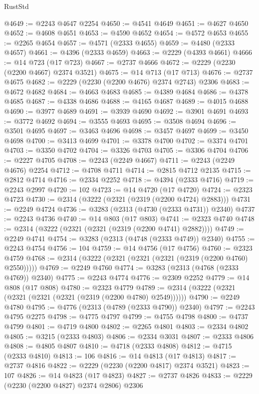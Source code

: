 \begin{lexlean}{RustStd}
\begin{coremodule}
@4649 := @2243 @4647 @2254
@4650 := @4541 @4649
@4651 := @4627 @4650
@4652 := @4608 @4651
@4653 := @4590 @4652
@4654 := @4572 @4653
@4655 := @2265 @4654
@4657 := @4571 (@2333 @4655)
@4659 := @4480 (@2333 @4657)
@4661 := @4396 (@2333 @4659)
@4663 := @2229 (@4393 @4661)
@4666 := @14 @723 (@17 @723)
@4667 := @2737 @4666
@4672 := @2229 (@2230 (@2200 @4667) @2374 @3521)
@4675 := @14 @713 (@17 @713)
@4676 := @2737 @4675
@4682 := @2229 (@2230 (@2200 @4676) @2374 @2743) @2306
@4683 := @4672 @4682
@4684 := @4663 @4683
@4685 := @4389 @4684
@4686 := @4378 @4685
@4687 := @4338 @4686
@4688 := @4165 @4687
@4689 := @4015 @4688
@4690 := @3977 @4689
@4691 := @3939 @4690
@4692 := @3901 @4691
@4693 := @3772 @4692
@4694 := @3555 @4693
@4695 := @3508 @4694
@4696 := @3501 @4695
@4697 := @3463 @4696
@4698 := @3457 @4697
@4699 := @3450 @4698
@4700 := @3413 @4699
@4701 := @3378 @4700
@4702 := @3374 @4701
@4703 := @3350 @4702
@4704 := @3326 @4703
@4705 := @3306 @4704
@4706 := @2227 @4705
@4708 := @2243 (@2249 @4667)
@4711 := @2243 (@2249 @4676) @2254
@4712 := @4708 @4711
@4714 := @2815 @4712 @2135
@4715 := @2812 @4714
@4716 := @2334 @2252
@4718 := @4394 (@2333 @4716)
@4719 := @2243 @2997
@4720 := 102
@4723 := @14 @4720 (@17 @4720)
@4724 := @2323 @4723
@4730 := @2314 (@3222 (@2321 (@2319 (@2200 @4724) @2883)))
@4731 := @2249 @4724
@4736 := @3283 (@2313 (@4730 (@2333 @4731)) @2340)
@4737 := @2243 @4736
@4740 := @14 @803 (@17 @803)
@4741 := @2323 @4740
@4748 := @2314 (@3222 (@2321 (@2321 (@2319 (@2200 @4741) @2882))))
@4749 := @2249 @4741
@4754 := @3283 (@2313 (@4748 (@2333 @4749)) @2340)
@4755 := @2243 @4754
@4756 := 104
@4759 := @14 @4756 (@17 @4756)
@4760 := @2323 @4759
@4768 := @2314 (@3222 (@2321 (@2321 (@2321 (@2319 (@2200 @4760) @2550)))))
@4769 := @2249 @4760
@4774 := @3283 (@2313 (@4768 (@2333 @4769)) @2340)
@4775 := @2243 @4774
@4776 := @2309 @2252
@4779 := @14 @808 (@17 @808)
@4780 := @2323 @4779
@4789 := @2314 (@3222 (@2321 (@2321 (@2321 (@2321 (@2319 (@2200 @4780) @2549))))))
@4790 := @2249 @4780
@4795 := @4776 (@2313 (@4789 (@2333 @4790)) @2340)
@4797 := @2243 @4795 @2275
@4798 := @4775 @4797
@4799 := @4755 @4798
@4800 := @4737 @4799
@4801 := @4719 @4800
@4802 := @2265 @4801
@4803 := @2334 @4802
@4805 := @3215 (@2333 @4803)
@4806 := @2334 @3031
@4807 := @2333 @4806
@4808 := @4805 @4807
@4810 := @4718 (@2333 @4808)
@4812 := @4715 (@2333 @4810)
@4813 := 106
@4816 := @14 @4813 (@17 @4813)
@4817 := @2737 @4816
@4822 := @2229 (@2230 (@2200 @4817) @2374 @3521)
@4823 := 107
@4826 := @14 @4823 (@17 @4823)
@4827 := @2737 @4826
@4833 := @2229 (@2230 (@2200 @4827) @2374 @2806) @2306

\end{coremodule}
\end{lexlean}
